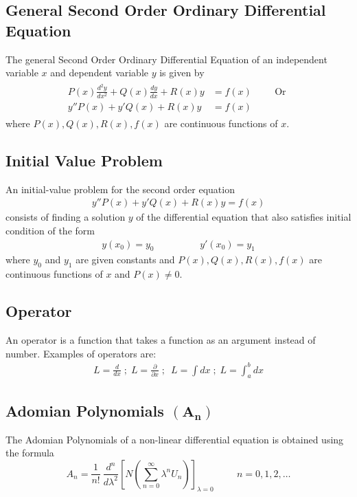 \documentclass[11pt]{report}
\newcommand{\sps}{\\[0.2cm]}
\newcommand{\sprime}{'}
\newcommand{\dprime}{''}
\begin{document}
	\subsection{General Second Order Ordinary Differential Equation}
	The general Second Order Ordinary Differential Equation of an independent variable $x$ and dependent variable $y$ is given by 
	\begin{eqnarray*}
		\begin{split}
			P(x)\frac{d^2y}{dx^2} + Q(x)\frac{dy}{dx} + R(x)y &= f(x) \hspace{1cm} \text{Or }\sps
			y\dprime P(x) + y\sprime Q(x) + R(x)y &= f(x)
		\end{split}
	\end{eqnarray*}
	where $P(x), Q(x), R(x),f(x)$ are continuous functions of $x$.
	
	\subsection{Initial Value Problem}
	An initial-value problem for the second order equation
	\begin{eqnarray*}
		y\dprime P(x) + y\sprime Q(x) + R(x)y = f(x)
	\end{eqnarray*}
	consists of finding a solution $y$ of the differential equation that also satisfies initial condition of the form
	\begin{eqnarray*}
		y(x_0) = y_0 \hspace{2cm} y\sprime(x_0) = y_1
	\end{eqnarray*}
	where $y_0$ and $y_1$ are given constants and $P(x), Q(x), R(x),f(x)$ are continuous functions of $x$ and $P(x)\neq 0$.
	
	\subsection{Operator}
	An operator is a function that takes a function as an argument instead of number. Examples of operators are:
	\begin{eqnarray*}
		L = \frac{d}{dx}\; ; \; L=\frac{\partial}{\partial x}\; ; \ \; L = \int dx\; ; \; L= \int_a^b dx
	\end{eqnarray*}
	
	\subsection{Adomian Polynomials $\mathbf{(A_n)}$}
	The Adomian Polynomials of a non-linear differential equation is obtained using the formula
	\begin{equation}
		A_n = \frac{1}{n!}~\frac{d^n}{d\lambda^2}\left[ N\left(\sum_{n=0}^{\infty}\lambda^n U_n\right)\right]_{\lambda=0}\hspace{1cm} n=0,1,2,\ldots
	\end{equation}
\end{document}
